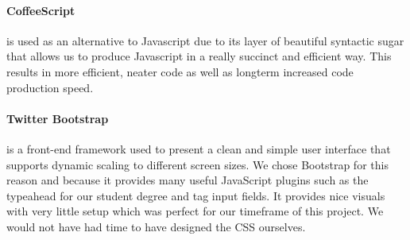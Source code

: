 		\paragraph{CoffeeScript\cite{coffeescript}} is used as an alternative to Javascript due to its layer of beautiful syntactic sugar that allows us to produce Javascript in a really succinct and efficient way. This results in more efficient, neater code as well as longterm increased code production speed.
		\paragraph{Twitter Bootstrap\cite{bootstrap}} is a front-end framework used to present a clean and simple user interface that supports dynamic scaling to different screen sizes. We chose Bootstrap for this reason and because it provides many useful JavaScript plugins such as the typeahead for our student degree and tag input fields. It provides nice visuals with very little setup which was perfect for our timeframe of this project. We would not have had time to have designed the CSS ourselves.